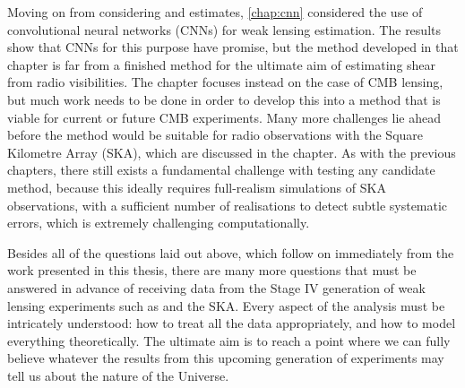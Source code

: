 Moving on from considering \Euclid{} and \pcl{} estimates, \autoref{chap:cnn} considered the use of convolutional neural networks (CNNs) for weak lensing estimation. The results show that CNNs for this purpose have promise, but the method developed in that chapter is far from a finished method for the ultimate aim of estimating shear from radio visibilities. The chapter focuses instead on the case of CMB lensing, but much work needs to be done in order to develop this into a method that is viable for current or future CMB experiments. Many more challenges lie ahead before the method would be suitable for radio observations with the Square Kilometre Array (SKA), which are discussed in the chapter. As with the previous chapters, there still exists a fundamental challenge with testing any candidate method, because this ideally requires full-realism simulations of SKA observations, with a sufficient number of realisations to detect subtle systematic errors, which is extremely challenging computationally.

Besides all of the questions laid out above, which follow on immediately from the work presented in this thesis, there are many more questions that must be answered in advance of receiving data from the Stage IV generation of weak lensing experiments such as \Euclid{} and the SKA. Every aspect of the analysis must be intricately understood: how to treat all the data appropriately, and how to model everything theoretically. The ultimate aim is to reach a point where we can fully believe whatever the results from this upcoming generation of experiments may tell us about the nature of the Universe.


% 

